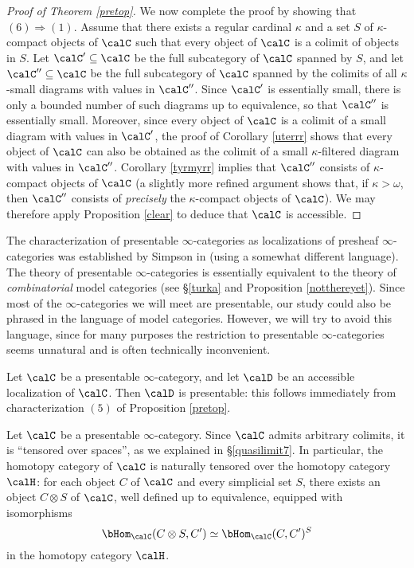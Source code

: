 \begin{proof}[Proof of Theorem \ref{pretop}]
We now complete the proof by showing that $(6)
\Rightarrow (1)$.  Assume that there exists a regular cardinal
$\kappa$ and a set $S$ of $\kappa$-compact objects of $\calC$ such
that every object of $\calC$ is a colimit of objects in $S$. Let $\calC' \subseteq \calC$ be the full subcategory of $\calC$ spanned by $S$, and let $\calC'' \subseteq \calC$ be the full subcategory
of $\calC$ spanned by the colimits of all $\kappa$-small diagrams with values in $\calC''$.
Since $\calC'$ is essentially small, there is only a bounded number of such diagrams up to equivalence, so that $\calC''$ is essentially small. Moreover, since every object of $\calC$
is a colimit of a small diagram with values in $\calC'$, the proof of Corollary \ref{uterrr} shows that
every object of $\calC$ can also be obtained as the colimit of a small $\kappa$-filtered diagram with values in $\calC''$. Corollary \ref{tyrmyrr} implies that $\calC''$ consists of $\kappa$-compact objects of $\calC$ (a slightly more refined argument shows that, if $\kappa > \omega$, then $\calC''$ consists of {\em precisely} the $\kappa$-compact objects of $\calC$). We may therefore apply Proposition \ref{clear} to deduce that $\calC$ is accessible.
\end{proof}

\begin{remark}\label{modelcatpresentcat}
The characterization of presentable $\infty$-categories as localizations of presheaf $\infty$-categories was established by Simpson in \cite{simpson} (using a somewhat different language). 
The theory of presentable $\infty$-categories is essentially equivalent to the theory of {\em combinatorial} model categories (see \S \ref{turka} and Proposition \ref{notthereyet}).
Since most of the $\infty$-categories we will meet are presentable, our study
could also be phrased in the language of model categories. However, we will try to avoid this language, since for many purposes the restriction to presentable
$\infty$-categories seems unnatural and is often technically
inconvenient.
\end{remark}

\begin{remark}
Let $\calC$ be a presentable $\infty$-category, and let $\calD$ be an accessible localization of $\calC$. Then $\calD$ is presentable: this follows immediately from characterization $(5)$ of Proposition \ref{pretop}.
\end{remark}

\begin{remark}\label{tensored}
Let $\calC$ be a presentable $\infty$-category. Since $\calC$ admits arbitrary
colimits, it is ``tensored over spaces'', as we explained in 
\S \ref{quasilimit7}. In particular, the homotopy category of $\calC$ is naturally tensored over the homotopy category $\calH$: for each object $C$ of $\calC$ and every simplicial set $S$, there exists an object $C \otimes S$ of $\calC$, well defined up to equivalence, equipped with isomorphisms $$ \bHom_{\calC}(C \otimes S, C') \simeq
\bHom_{\calC}(C,C')^{S}$$
in the homotopy category $\calH$.
\end{remark}

